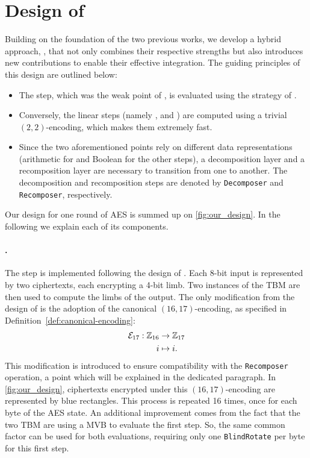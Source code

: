 \section{Design of \hippo}
\label{sec:hippogryph_our_work}

Building on the foundation of the two previous works, we develop a hybrid approach, \hippo, that not only combines their respective strengths but also introduces new contributions to enable their effective integration. The guiding principles of this design are outlined below:

\begin{itemize}
    \item The \SubBytes step, which was the weak point of \cite{TCHES:BonPoiRiv24}, is evaluated using the strategy of \cite{DBLP:conf/wahc/TramaCBS23}.
    \item Conversely, the linear steps (namely \ShiftRows, \MixColumns and \AddRoundKey) are computed using a trivial $(2, 2)$-encoding, which makes them extremely fast.
    \item Since the two aforementioned points rely on different data representations (arithmetic for \SubBytes and Boolean for the other steps), a decomposition layer and a recomposition layer are necessary to transition from one to another. The decomposition and recomposition steps are denoted by \texttt{Decomposer} and \texttt{Recomposer}, respectively. %
\end{itemize}

Our design for one round of AES is summed up on \ref{fig:our_design}. In the following we explain each of its components.




\paragraph{\SubBytes.} The \SubBytes step is implemented following the design of \cite{DBLP:conf/wahc/TramaCBS23}. Each 8-bit input is represented by two ciphertexts, each encrypting a 4-bit limb. Two instances of the TBM are then used to compute the limbs of the output. The only modification from the design of \cite{DBLP:conf/wahc/TramaCBS23} is the adoption of the canonical $(16, 17)$-encoding, as specified in Definition~\ref{def:canonical-encoding}:
\begin{align*}
    \mathcal{E}_{17}: \mathbb{Z}_{16} &\rightarrow \mathbb{Z}_{17}\\
     i &\mapsto i.
\end{align*}
This modification is introduced to ensure compatibility with the \texttt{Recomposer} operation, a point which will be explained in the dedicated paragraph. In \ref{fig:our_design}, ciphertexts encrypted under this $(16, 17)$-encoding are represented by blue rectangles. This process is repeated 16 times, once for each byte of the AES state.
An additional improvement comes from the fact that the two TBM are using a MVB to evaluate the first step. So, the same common factor can be used for both evaluations, requiring only one \texttt{BlindRotate} per byte for this first step. 


